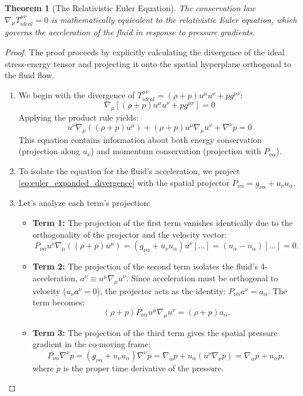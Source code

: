 \documentclass[11pt, letterpaper]{report}
\theoremstyle{plain} %
\newtheorem{theorem}{Theorem}[chapter]
\theoremstyle{definition} %
\theoremstyle{remark} %
\begin{document}
\begin{theorem}[The Relativistic Euler Equation]
\label{thm:relativistic_euler}
The conservation law $\nabla_\mu T^{\mu\nu}_{ideal} = 0$ is mathematically equivalent to the relativistic Euler equation, which governs the acceleration of the fluid in response to pressure gradients.
\end{theorem}
\begin{proof}
The proof proceeds by explicitly calculating the divergence of the ideal stress-energy tensor and projecting it onto the spatial hyperplane orthogonal to the fluid flow.

\begin{enumerate}
    \item We begin with the divergence of $T^{\mu\nu}_{ideal} = (\rho+p)u^\mu u^\nu + p g^{\mu\nu}$:
    \begin{equation}
        \nabla_\mu [(\rho+p)u^\mu u^\nu + p g^{\mu\nu}] = 0
    \end{equation}
    Applying the product rule yields:
    \begin{equation}
        u^\nu \nabla_\mu ((\rho+p)u^\mu) + (\rho+p)u^\mu \nabla_\mu u^\nu + \nabla^\nu p = 0
        \label{eq:euler_expanded_divergence}
    \end{equation}
    This equation contains information about both energy conservation (projection along $u_\nu$) and momentum conservation (projection with $P_{\nu\alpha}$).

    \item To isolate the equation for the fluid's acceleration, we project \cref{eq:euler_expanded_divergence} with the spatial projector $P_{\nu\alpha} = g_{\nu\alpha} + u_\nu u_\alpha$.

    \item Let's analyze each term's projection:
    \begin{itemize}
        \item \textbf{Term 1:} The projection of the first term vanishes identically due to the orthogonality of the projector and the velocity vector:
        $$ P_{\nu\alpha} u^\nu \nabla_\mu ((\rho+p)u^\mu) = (g_{\nu\alpha} + u_\nu u_\alpha) u^\nu [\dots] = (u_\alpha - u_\alpha)[\dots] = 0. $$
        \item \textbf{Term 2:} The projection of the second term isolates the fluid's 4-acceleration, $a^\nu \equiv u^\mu \nabla_\mu u^\nu$. Since acceleration must be orthogonal to velocity ($u_\nu a^\nu = 0$), the projector acts as the identity: $P_{\nu\alpha}a^\nu = a_\alpha$. The term becomes:
        $$ (\rho+p)P_{\nu\alpha} u^\mu \nabla_\mu u^\nu = (\rho+p)a_\alpha. $$
        \item \textbf{Term 3:} The projection of the third term gives the spatial pressure gradient in the co-moving frame:
        $$ P_{\nu\alpha}\nabla^\nu p = (g_{\nu\alpha} + u_\nu u_\alpha)\nabla^\nu p = \nabla_\alpha p + u_\alpha (u^\nu\nabla_\nu p) = \nabla_\alpha p + u_\alpha \dot{p}, $$
        where $\dot{p}$ is the proper time derivative of the pressure.
    \end{itemize}


\end{enumerate}
\end{proof}
\end{document}
